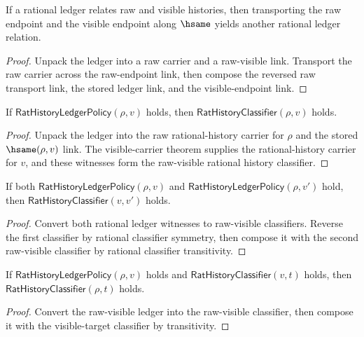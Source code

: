 \begin{theorem}
\label{thm:rat-ledger-hsame-transport}
If a rational ledger relates raw and visible histories, then transporting the
raw endpoint and the visible endpoint along \(\hsame\) yields another rational
ledger relation.
\end{theorem}
\begin{proof}
Unpack the ledger into a raw carrier and a raw-visible link. Transport the raw
carrier across the raw-endpoint link, then compose the reversed raw transport
link, the stored ledger link, and the visible-endpoint link.
\end{proof}

\begin{theorem}
\label{thm:rat-ledger-raw-visible-classifier}
If $\mathsf{RatHistoryLedgerPolicy}(\rho,v)$ holds, then
$\mathsf{RatHistoryClassifier}(\rho,v)$ holds.
\end{theorem}
\begin{proof}
Unpack the ledger into the raw rational-history carrier for $\rho$ and the
stored $\hsame(\rho,v)$ link. The visible-carrier theorem supplies the
rational-history carrier for $v$, and these witnesses form the raw-visible
rational history classifier.
\end{proof}

\begin{theorem}
\label{thm:rat-history-ledger-policy-shared-raw-visible-classifier}
If both $\mathsf{RatHistoryLedgerPolicy}(\rho,v)$ and
$\mathsf{RatHistoryLedgerPolicy}(\rho,v')$ hold, then
$\mathsf{RatHistoryClassifier}(v,v')$ holds.
\end{theorem}
\begin{proof}
Convert both rational ledger witnesses to raw-visible classifiers. Reverse the
first classifier by rational classifier symmetry, then compose it with the
second raw-visible classifier by rational classifier transitivity.
\end{proof}

\begin{theorem}
\label{thm:rat-ledger-classifier-extension}
If $\mathsf{RatHistoryLedgerPolicy}(\rho,v)$ holds and
$\mathsf{RatHistoryClassifier}(v,t)$ holds, then
$\mathsf{RatHistoryClassifier}(\rho,t)$ holds.
\end{theorem}
\begin{proof}
Convert the raw-visible ledger into the raw-visible classifier, then compose it
with the visible-target classifier by transitivity.
\end{proof}

